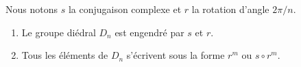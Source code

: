 \begin{proposition} \label{PropLDIPoZ}
	Nous notons \( s\) la conjugaison complexe et \( r\) la rotation d'angle \( 2\pi/n\).
	\begin{enumerate}
		\item
		      Le groupe diédral \( D_n\) est engendré par \( s\) et \( r\).
		\item       \label{ITEMooOEBHooULRmZk}
		      Tous les éléments de \( D_n\) s'écrivent sous la forme \( r^m\) ou \( s\circ r^m\).
	\end{enumerate}
\end{proposition}

